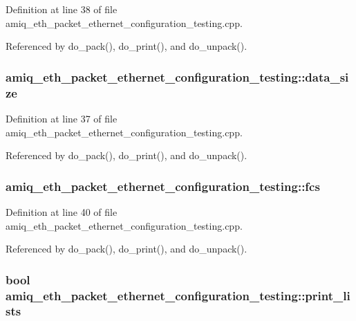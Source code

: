 Definition at line 38 of file amiq\_\-eth\_\-packet\_\-ethernet\_\-configuration\_\-testing.cpp.

Referenced by do\_\-pack(), do\_\-print(), and do\_\-unpack().\hypertarget{classamiq__eth__packet__ethernet__configuration__testing_a296a5b8f577059bed0991b13b4337c83}{
\subsubsection[{data\_\-size}]{ {\bf amiq\_\-eth\_\-packet\_\-ethernet\_\-configuration\_\-testing::data\_\-size}}}
\label{classamiq__eth__packet__ethernet__configuration__testing_a296a5b8f577059bed0991b13b4337c83}


Definition at line 37 of file amiq\_\-eth\_\-packet\_\-ethernet\_\-configuration\_\-testing.cpp.

Referenced by do\_\-pack(), do\_\-print(), and do\_\-unpack().\hypertarget{classamiq__eth__packet__ethernet__configuration__testing_a5e8b2f14ebe61f3e98618033ebe246e4}{
\subsubsection[{fcs}]{ {\bf amiq\_\-eth\_\-packet\_\-ethernet\_\-configuration\_\-testing::fcs}}}
\label{classamiq__eth__packet__ethernet__configuration__testing_a5e8b2f14ebe61f3e98618033ebe246e4}


Definition at line 40 of file amiq\_\-eth\_\-packet\_\-ethernet\_\-configuration\_\-testing.cpp.

Referenced by do\_\-pack(), do\_\-print(), and do\_\-unpack().\hypertarget{classamiq__eth__packet__ethernet__configuration__testing_a9804a9d571b8172916ee9dd61d1860c5}{
\subsubsection[{print\_\-lists}]{\setlength{\rightskip}{0pt plus 5cm}bool {\bf amiq\_\-eth\_\-packet\_\-ethernet\_\-configuration\_\-testing::print\_\-lists}}}
\label{classamiq__eth__packet__ethernet__configuration__testing_a9804a9d571b8172916ee9dd61d1860c5}


